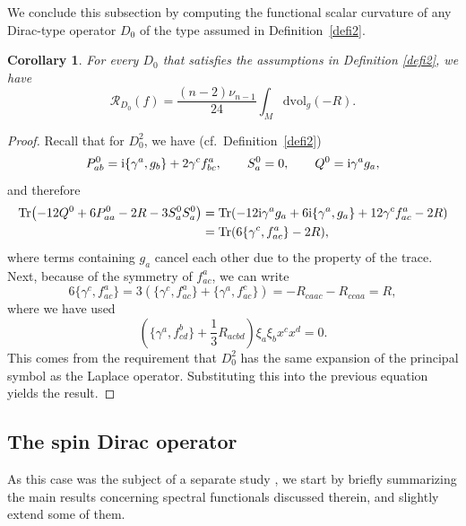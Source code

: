 \documentclass[10pt,a4paper]{amsart}
\numberwithin{equation}{section}
\newtheorem{Corollary}[Theorem]{Corollary}
\theoremstyle{definition}
\def\Tr{\mathrm{Tr}}
\def\dv{\mathrm{dvol}_g}
\begin{document}
	We conclude this subsection by computing the functional scalar curvature of any Dirac-type operator $D_0$ of the type assumed in Definition~\ref{defi2}.
	\begin{Corollary}
		For every $D_0$ that satisfies the assumptions in Definition {\rm\ref{defi2}}, we have
		\[ \mathscr{R}_{D_0}(f) = \frac{(n-2)\nu_{n-1}}{24}\int_M \dv (-R). \]
	\end{Corollary}
	
	\begin{proof}
		Recall that for $D^2_0$, we have (cf.\ Definition~\ref{defi2})
		\[
			P^0_{ab}={\rm i}\{\gamma^a,g_b\}+2\gamma^cf^a_{bc},
			\qquad S_a^0=0,\qquad Q^0={\rm i}\gamma^ag_a,
		\]
		and therefore
		\begin{align*}
			\Tr\bigl(-12Q^0+6P^0_{aa}-2R-3S^0_aS^0_a\bigr)&=
			\Tr(-12{\rm i}\gamma^ag_a+6{\rm i}\{\gamma^a,g_a\}+12\gamma^cf^a_{ac}-2R)\\
			&=\Tr(6\{\gamma^c,f^a_{ac}\}-2R),
		\end{align*}
		where terms containing $g_a$ cancel each other due to the property of the trace. Next, because of the symmetry of $f^a_{ac}$, we can write
		\[
		6\{\gamma^c,f^a_{ac}\}=3(\{\gamma^c,f^a_{ac}\}+\{\gamma^a,f^c_{ac}\})=-R_{caac}-R_{ccaa}=R,
		\]
		where we have used
		\[
			\left(\bigl\{\gamma^a,f^b_{cd}\bigr\}+\frac13 R_{acbd} \right)\xi_a\xi_b x^c x^d=0.
		\]
		This comes from the requirement that $D_0^2$ has the same expansion of the principal symbol as the Laplace operator.
		Substituting this into the previous equation yields the result.
	\end{proof}
	
\subsection{The spin Dirac operator}
As this case was the subject of a separate study \cite{bochniak2025}, we start by briefly summarizing
the main results concerning spectral functionals discussed therein, and slightly extend some of them.
\end{document}

